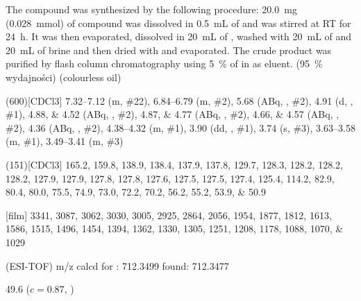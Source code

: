 The compound was synthesized by the following procedure:
\SI{20.0}{\milli\gram} (\SI{0.028}{\milli\mol}) of compound  was dissolved in \SI{0.5}{\milli\liter} of  and was stirred at RT for \SI{24}{\hour}.
It was then evaporated, dissolved in \SI{20}{\milli\liter} of ,
washed with \SI{20}{\milli\liter} of  and \SI{20}{\milli\liter} of brine and then dried with  and evaporated.
The crude product was purified by flash column chromatography using \SI{5}{\percent} of  in  as eluent.
(\SI{95}{\percent} wydajności) (colourless oil)
\begin{fullexp}
	\NMR(600)[CDCl3] \numrange{7.32}{7.12} (m, \#{22}), \numrange{6.84}{6.79} (m, \#{2}), \num{5.68} (ABq, , \#{2}), \num{4.91} (d, , \#{1}), \numlist{4.88;4.52} (ABq, , \#{2}), \numlist{4.87;4.77} (ABq, , \#{2}), \numlist{4.66;4.57} (ABq, , \#{2}), \num{4.36} (ABq, , \#{2}), \numrange{4.38}{4.32} (m, \#{1}), \num{3.90} (dd, , \#{1}), \num{3.74} (s, \#{3}), \numrange{3.63}{3.58} (m, \#{1}), \numrange{3.49}{3.41} (m, \#{3})\par\noindent
	(151)[CDCl3] \numlist{165.2; 159.8; 138.9; 138.4; 137.9; 137.8; 129.7; 128.3; 128.2; 128.2; 128.2; 127.9; 127.9; 127.8; 127.8; 127.6; 127.5; 127.5; 127.4; 125.4; 114.2; 82.9; 80.4; 80.0; 75.5; 74.9; 73.0; 72.2; 70.2; 56.2; 55.2; 53.9; 50.9}\par\noindent
	[film] \numlist{3341; 3087; 3062; 3030; 3005; 2925; 2864; 2056; 1954; 1877; 1812; 1613; 1586; 1515; 1496; 1454; 1394; 1362; 1330; 1305; 1251; 1208; 1178; 1088; 1070; 1029}\par\noindent
	 (ESI-TOF) m/z calcd for : \num{712.3499} found: \num{712.3477}\par\noindent
	\data{[$\alpha^{23}_D$]~$=$} \num{49.6} ($c = 0.87$, )
\end{fullexp}

